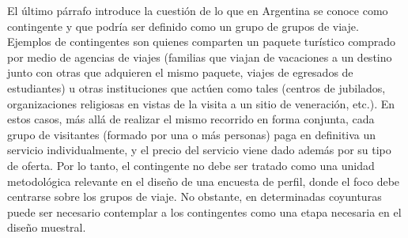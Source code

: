 \documentclass[
]{book}
\begin{document}
El último párrafo introduce la cuestión de lo que en Argentina se conoce como contingente y que podría ser definido como un grupo de grupos de viaje. Ejemplos de contingentes son quienes comparten un paquete turístico comprado por medio de agencias de viajes (familias que viajan de vacaciones a un destino junto con otras que adquieren el mismo paquete, viajes de egresados de estudiantes) u otras instituciones que actúen como tales (centros de jubilados, organizaciones religiosas en vistas de la visita a un sitio de veneración, etc.). En estos casos, más allá de realizar el mismo recorrido en forma conjunta, cada grupo de visitantes (formado por una o más personas) paga en definitiva un servicio individualmente, y el precio del servicio viene dado además por su tipo de oferta. Por lo tanto, el contingente no debe ser tratado como una unidad metodológica relevante en el diseño de una encuesta de perfil, donde el foco debe centrarse sobre los grupos de viaje. No obstante, en determinadas coyunturas puede ser necesario contemplar a los contingentes como una etapa necesaria en el diseño muestral.
\end{document}
